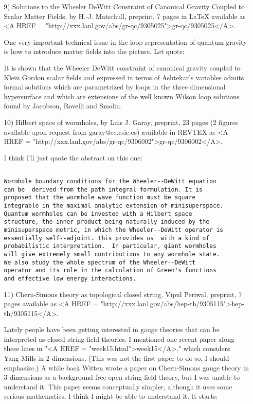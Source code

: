 9)  Solutions to the Wheeler DeWitt Constraint of Canonical Gravity Coupled to
Scalar Matter Fields, by H.-J. Matschull, preprint, 7 pages in LaTeX
available as <A HREF = "http://xxx.lanl.gov/abs/gr-qc/9305025">gr-qc/9305025</A>.

One very important technical issue in the loop representation of quantum
gravity is how to introduce matter fields into the picture.  Let quote:

It is shown that the Wheeler DeWitt constraint of canonical gravity
coupled to Klein Gordon scalar fields and expressed in terms
of Ashtekar's variables admits formal solutions which are parametrized
by loops in the three dimensional hypersurface and which are
extensions of  the well known Wilson loop solutions found by
Jacobson, Rovelli and Smolin.

10) Hilbert space of wormholes, by Luis J. Garay, preprint, 23 pages (2
figures available upon request from garay@cc.csic.es) available in REVTEX as
<A HREF = "http://xxx.lanl.gov/abs/gr-qc/9306002">gr-qc/9306002</A>.   
 
I think I'll just quote the abstract on this one:


\begin{verbatim}

Wormhole boundary conditions for the Wheeler--DeWitt equation
can be  derived from the path integral formulation. It is
proposed that the wormhole wave function must be square
integrable in the maximal analytic extension of minisuperspace.
Quantum wormholes can be invested with a Hilbert space
structure, the inner product being naturally induced by the
minisuperspace metric, in which the Wheeler--DeWitt operator is
essentially self--adjoint. This provides us  with a kind of
probabilistic interpretation.  In particular, giant wormholes
will give extremely small contributions to any wormhole state.
We also study the whole spectrum of the Wheeler--DeWitt
operator and its role in the calculation of Green's functions
and effective low energy interactions.
\end{verbatim}
    

11) Chern-Simons theory as topological closed string,
Vipul Periwal, preprint, 7 pages available as <A HREF = "http://xxx.lanl.gov/abs/hep-th/9305115">hep-th/9305115</A>.  

Lately people have been getting interested in gauge theories that can be
interpreted as closed string field theories.  I mentioned one recent
paper along these lines in "<A HREF = "week15.html">week15</A>," which considers Yang-Mills in 2
dimensions.  (This was not the first paper to do so, I should
emphasize.)  A while back Witten wrote a paper on Chern-Simons gauge
theory in 3 dimensions as a background-free open string field theory,
but I was unable to understand it.  This paper seems conceptually
simpler, although it uses some serious mathematics.  I think I might be
able to understand it.  It starts:


